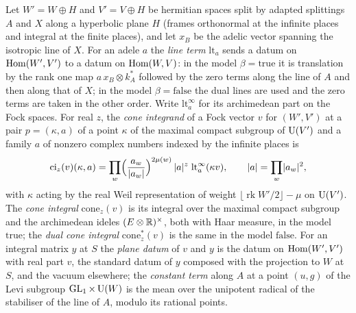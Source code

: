 Let $W'=W\oplus H$ and $V'=V\oplus H$ be hermitian spaces split by adapted splittings $A$ and $X$ along a hyperbolic plane $H$ (frames orthonormal at the infinite places and integral at the
finite places), and let $x_B$ be the adelic vector spanning the isotropic line of $X$. For an adele $a$ the \emph{line term} $\mathrm{lt}_a$ sends a datum on $\operatorname{Hom}(W',V')$ to a datum on $\operatorname{Hom}(W,V)$:
in the model $\beta=\mathrm{true}$ it is translation by the rank one map $a\,x_B\otimes k_A^*$ followed by the zero terms along the line of $A$ and then along that of $X$; in the model
$\beta=\mathrm{false}$ the dual lines are used and the zero terms are taken in the other order. Write $\mathrm{lt}^\infty_a$ for its archimedean part on the Fock spaces. For real $z$, the \emph{cone
integrand} of a Fock vector $v$ for $(W',V')$ at a pair $p=(\kappa,a)$ of a point $\kappa$ of the maximal compact subgroup of $\operatorname{U}(V')$ and a family $a$ of nonzero complex numbers indexed by the
infinite places is
\[
  \mathrm{ci}_z(v)(\kappa,a)=\prod_w\Bigl(\frac{a_w}{\lvert a_w\rvert}\Bigr)^{2\mu(w)}\,\lvert a\rvert^{z}\;\mathrm{lt}^\infty_a(\kappa v),\qquad \lvert a\rvert=\prod_w\lvert a_w\rvert^2,
\]
with $\kappa$ acting by the real Weil representation of weight $\lfloor\operatorname{rk}W'/2\rfloor-\mu$ on $\operatorname{U}(V')$. The \emph{cone integral} $\mathrm{cone}_z(v)$ is its integral over the maximal compact
subgroup and the archimedean ideles $(E\otimes\mathbb{R})^\times$, both with Haar measure, in the model $\mathrm{true}$; the \emph{dual cone integral} $\mathrm{cone}^*_z(v)$ is the same in the model $\mathrm{false}$.
For an integral matrix $y$ at $S$ the \emph{plane datum} of $v$ and $y$ is the datum on $\operatorname{Hom}(W',V')$ with real part $v$, the standard datum of $y$ composed with the projection to $W$ at $S$, and the
vacuum elsewhere; the \emph{constant term} along $A$ at a point $(u,g)$ of the Levi subgroup $\operatorname{GL}_1\times\operatorname{U}(W)$ is the mean over the unipotent radical of the stabiliser of the line of $A$, modulo its
rational points.

